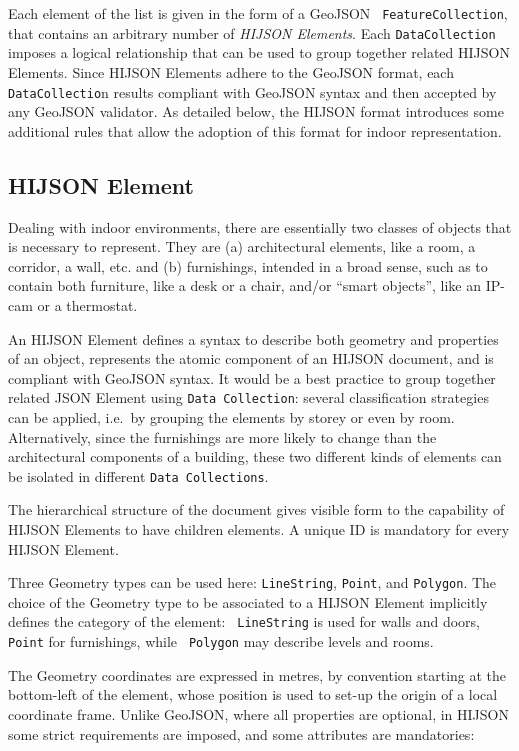 Each element of the list is given in the form of a GeoJSON {\tt
FeatureCollection}, that contains an arbitrary  number of \emph{HIJSON Elements}.
Each {\tt DataCollection} imposes a logical relationship that can be used
to group together related HIJSON Elements. Since  HIJSON Elements adhere to
the GeoJSON format, each {\tt DataCollectio}n results compliant with GeoJSON
syntax and then accepted by any GeoJSON validator. As detailed below, the
HIJSON format  introduces some additional rules that allow the adoption of
this format for indoor representation.


\subsection{HIJSON Element}

Dealing with indoor environments, there are essentially two classes of objects
that is necessary to represent. They are (a) architectural elements, like a
room, a corridor, a wall, etc. and (b) furnishings, intended in a broad sense,
such as to contain both furniture, like a desk or a chair, and/or ``smart objects'',
like an IP-cam or a thermostat.

An HIJSON Element defines a syntax to describe both geometry and properties of
an object, represents the atomic component of an HIJSON document, and is compliant with GeoJSON syntax. 
It would be a best practice to group
together related JSON Element using {\tt Data Collection}: several classification strategies
can be applied, i.e.~by grouping the elements by storey or even by room.
Alternatively, since the furnishings are more likely to change than the
architectural components of a building, these two different kinds of elements
can be isolated in different {\tt Data Collections}.

The hierarchical structure of the document gives visible form to the capability of HIJSON Elements to have children elements. A unique ID is mandatory for every HIJSON Element. 

Three Geometry types can be used here: {\tt LineString},
{\tt Point}, and {\tt Polygon}. The choice of the Geometry type to be associated to
a HIJSON Element implicitly defines the category of the element: {\tt
LineString} is used for walls and doors, {\tt Point} for furnishings, while {\tt
Polygon} may describe levels and rooms.

The Geometry coordinates are expressed in metres, by convention starting
at the bottom-left of the element, whose position is used to set-up the origin of a local coordinate frame. Unlike GeoJSON, where all properties
are optional, in HIJSON some strict requirements are imposed, and some
attributes are mandatories:

